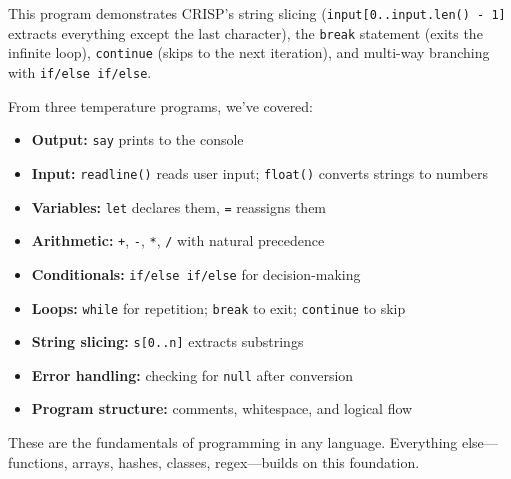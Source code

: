 This program demonstrates CRISP's string slicing (\texttt{input[0..input.len() - 1]} extracts everything except the last character), the \texttt{break} statement (exits the infinite loop), \texttt{continue} (skips to the next iteration), and multi-way branching with \texttt{if/else if/else}.

\begin{tcolorbox}[colback=lightlavender, colframe=softvioletdark, title=\textbf{\textcolor{darkpurple}{What We Learned}}, fonttitle=\bfseries, sharp corners]
From three temperature programs, we've covered:

\begin{itemize}
    \item \textbf{Output:} \texttt{say} prints to the console
    \item \textbf{Input:} \texttt{readline()} reads user input; \texttt{float()} converts strings to numbers
    \item \textbf{Variables:} \texttt{let} declares them, \texttt{=} reassigns them
    \item \textbf{Arithmetic:} \texttt{+}, \texttt{-}, \texttt{*}, \texttt{/} with natural precedence
    \item \textbf{Conditionals:} \texttt{if/else if/else} for decision-making
    \item \textbf{Loops:} \texttt{while} for repetition; \texttt{break} to exit; \texttt{continue} to skip
    \item \textbf{String slicing:} \texttt{s[0..n]} extracts substrings
    \item \textbf{Error handling:} checking for \texttt{null} after conversion
    \item \textbf{Program structure:} comments, whitespace, and logical flow
\end{itemize}

These are the fundamentals of programming in any language. Everything else—functions, arrays, hashes, classes, regex—builds on this foundation.
\end{tcolorbox}
